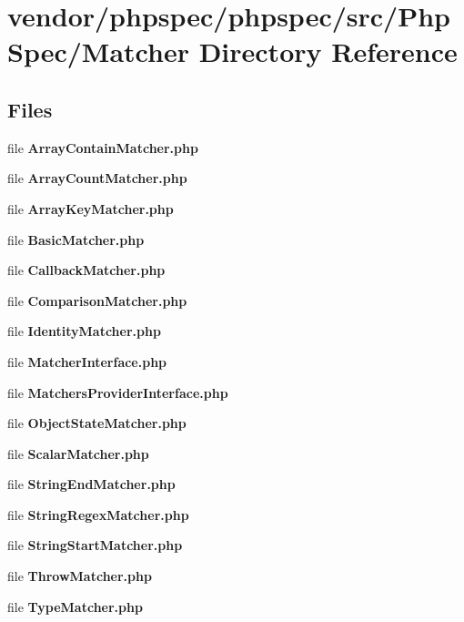\section{vendor/phpspec/phpspec/src/\+Php\+Spec/\+Matcher Directory Reference}
\label{dir_c8846b83b73050b756b354ac164b4ca9}
\subsection*{Files}
\begin{DoxyCompactItemize}
\item 
file {\bf Array\+Contain\+Matcher.\+php}
\item 
file {\bf Array\+Count\+Matcher.\+php}
\item 
file {\bf Array\+Key\+Matcher.\+php}
\item 
file {\bf Basic\+Matcher.\+php}
\item 
file {\bf Callback\+Matcher.\+php}
\item 
file {\bf Comparison\+Matcher.\+php}
\item 
file {\bf Identity\+Matcher.\+php}
\item 
file {\bf Matcher\+Interface.\+php}
\item 
file {\bf Matchers\+Provider\+Interface.\+php}
\item 
file {\bf Object\+State\+Matcher.\+php}
\item 
file {\bf Scalar\+Matcher.\+php}
\item 
file {\bf String\+End\+Matcher.\+php}
\item 
file {\bf String\+Regex\+Matcher.\+php}
\item 
file {\bf String\+Start\+Matcher.\+php}
\item 
file {\bf Throw\+Matcher.\+php}
\item 
file {\bf Type\+Matcher.\+php}
\end{DoxyCompactItemize}
